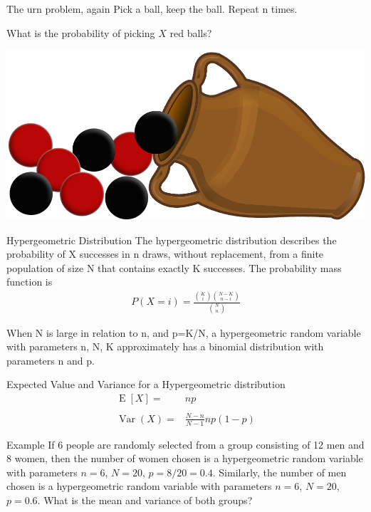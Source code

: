 \documentclass{beamer}
\newcommand{\E}{\operatorname{E}}
\newcommand{\Var}{\operatorname{Var}}
\begin{document}
\begin{frame}{The urn problem, again}
  Pick a ball, keep the ball. Repeat n times.

  What is the probability of picking $X$ red balls?

  \includegraphics[width=\linewidth]{urn2_small}
\end{frame}

\begin{frame}{Hypergeometric Distribution}
  The hypergeometric distribution describes the probability of \alert{X}
  successes in \alert{n} draws, without replacement, from a finite population of
  size \alert{N} that contains exactly \alert{K} successes. The probability mass
  function is
  \begin{align*}
    P(X=i) = \frac{\binom K i \binom {N-K} {n-i} }{\binom {N} {n}}
  \end{align*}

  When N is large in relation to n, and p=K/N, a hypergeometric random variable
  with parameters n, N, K approximately has a binomial distribution with
  parameters n and p.
\end{frame}

\begin{frame}{Expected Value and Variance for a Hypergeometric distribution}
  \begin{align*}
    \E[X] =& np\\
    \\
    \Var(X) =& \frac{N - n}{N - 1} np(1 - p)
  \end{align*}
\end{frame}

\begin{frame}[t]{Example}
  If 6 people are randomly selected from a group consisting of 12 men and 8
  women, then the number of women chosen is a hypergeometric random variable
  with parameters $n = 6$, $N = 20$, $p = 8/20 = 0.4$. Similarly, the number of
  men chosen is a hypergeometric random variable with parameters $n = 6$, $N = 20$,
  $p = 0.6$. What is the mean and variance of both groups?
\end{frame}
\end{document}
